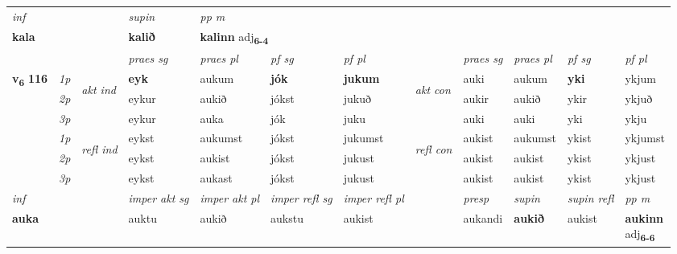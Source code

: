 \begin{longtable}[l]{X>{\footnotesize\itshape}llXXXXlXXXX}
\cmidrule{4-7}
   {\textit{inf}} & &      & \textit{supin}  & \textit{pp m} \\*
  {\textbf{kala}} & &      &  \textbf{kalið}  & \multicolumn{2}{l}{\textbf{kalinn} adj\textbf{\textsubscript{6-4}}} \\*

\midrule

 & &   & \textit{praes sg}  & \textit{praes pl}    & \textit{ pf sg} & \textit{pf pl} & & \textit{praes sg}  & \textit{praes pl}    & \textit{pf sg} & \textit{pf pl }  \\ \cmidrule{4-7} \cmidrule{9-12}
 \multirow{2}{*}{{{\textbf{v{\textsubscript{6}}} \Large{\textbf{116}}}}}  & 1p & \multirow{3}{*}{\begin{turn}{90}\textit{akt ind}\end{turn}} & \textbf{eyk} & aukum & \textbf{jók} & \textbf{jukum} & \multirow{3}{*}{\begin{turn}{90}\textit{akt con}\end{turn}} &auki & aukum & \textbf{yki} & ykjum\\*
 & 2p &  &  eykur  & aukið & jókst & jukuð & & aukir & aukið & ykir & ykjuð \\*
 & 3p &  & eykur & auka & jók & juku & & auki & auki& yki & ykju \\*
\cmidrule{4-7} \cmidrule{9-12}
 & 1p & \multirow{3}{*}{\begin{turn}{90}\textit{refl ind}\end{turn}}  & eykst & aukumst & jókst & jukumst & \multirow{3}{*}{\begin{turn}{90}\textit{refl con}\end{turn}}  &aukist & aukumst & ykist & ykjumst \\*
 & 2p &  & eykst & aukist & jókst & jukust & &aukist & aukist & ykist & ykjust \\*
 & 3p  & & eykst & aukast & jókst & jukust & & aukist & aukist& ykist & ykjust \\*
\cmidrule{4-7} \cmidrule{9-12}

   {\textit{inf}} & &  & \textit{imper akt sg} & \textit{imper akt pl} & \textit{imper refl sg} & \textit{imper refl pl} && \textit{presp} & \textit{supin} & \textit{supin refl} & \textit{pp m} \\*
  {\textbf{auka}} & && auktu  & aukið & aukstu & aukist && aukandi &  \textbf{aukið} & aukist & \specialcell{\textbf{aukinn} \\ adj\textbf{\textsubscript{6-6}}} \\*


\end{longtable}
